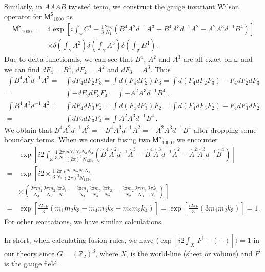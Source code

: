 \documentclass[11pt,nofootinbib,preprint]{revtex4-1}
\begin{document}
Similarly, in $AAAB$ twisted term, we construct the gauge invariant Wilson operator for $\mathsf{M^S}_{1000}$ as 
\begin{align}
	\mathsf{M^S}_{1000}=&4\exp \left[ i\int_{\omega}{C^1-\frac{1}{3}\frac{2\pi q}{N_1}\left( B^4A^2d^{-1}A^3-B^4A^3d^{-1}A^2-A^2A^3d^{-1}B^4 \right)} \right] \nonumber
	\\
	&\times \delta \left( \int_{\gamma}{A^2} \right) \delta \left( \int_{\gamma}{A^3} \right) \delta \left( \int_{\sigma}{B^4} \right) \,.
\end{align}
Due to delta functionals, we can see that $B^4$, $A^2$ and $A^3$ are all exact on $\omega$ and we can find $dF_4=B^4$, $dF_2=A^2$ and $dF_3=A^3$. Thus
\begin{align}
	\int{B^4A^2d^{-1}A^3}=&\int{dF_4dF_2F_3}=\int{d\left( F_4dF_2 \right) F_3}=\int{d\left( F_4dF_2F_3 \right) -F_4dF_2dF_3} \nonumber
	\\
	=&\int{-dF_2dF_3F_4}=\int{-A^2A^3d^{-1}B^4}\,,\nonumber
	\\
	\int{B^4A^3d^{-1}A^2}=&\int{dF_4dF_3F_2}=\int{d\left( F_4dF_3 \right) F_2}=\int{d\left( F_4dF_3F_2 \right) -F_4dF_3dF_2}\nonumber
	\\
	=&\int{dF_2dF_3F_4}=\int{A^2A^3d^{-1}B^4}\,.
\end{align}
We obtain that $B^4A^2d^{-1}A^3=-B^4A^3d^{-1}A^2=-A^2A^3d^{-1}B^4$ after dropping some boundary terms. When we consider fusing two $\mathsf{M^S}_{1000}$, we encounter 
\begin{align}
	&\exp \left[ i2\int_{\omega}{\frac{1}{3}\frac{2\pi}{N_1}\frac{pN_1N_2N_3N_4}{\left( 2\pi \right) ^3N_{1234}}\left( \hat{B}^4\hat{A}^2d^{-1}\hat{A}^3-\hat{B}^4\hat{A}^3d^{-1}\hat{A}^2-\hat{A}^2\hat{A}^3d^{-1}\hat{B}^4 \right)} \right] \nonumber
	\\
	=&\exp \left[ i2\times \frac{1}{3}\frac{2\pi}{N_1}\frac{pN_1N_2N_3N_4}{\left( 2\pi \right) ^3N_{1234}} \right. \nonumber
	\\
	&\left. \times \left( \frac{2\pi m_1}{N_4}\frac{2\pi m_2}{N_2}\frac{2\pi k_3}{N_3}-\frac{2\pi m_4}{N_4}\frac{2\pi m_3}{N_3}\frac{2\pi k_2}{N_2}-\frac{2\pi m_2}{N_2}\frac{2\pi m_3}{N_3}\frac{2\pi k_4}{N_4} \right) \right] \nonumber
	\\
	=&\exp \left[ \frac{i2\pi p}{3}\left( m_1m_2k_3-m_4m_3k_2-m_2m_3k_4 \right) \right] =\exp \left[ \frac{i2\pi p}{3}\left( 3m_1m_2k_3\right) \right]=1\,.
\end{align}
For other excitations, we have similar calculations. 

In short, when calculating fusion rules, we have $\langle \exp \left[ i2\int_{X_{\mathsf{i}}}{F^{\mathsf{i}}+\left( \cdots \right)} \right] \rangle =1$ in our theory since $G=\left( \mathbb{Z} _2 \right) ^3$, where $X_{\mathsf{i}}$ is the world-line (sheet or volume) and $F^{\mathsf{i}}$ is the gauge field. 
\end{document}
